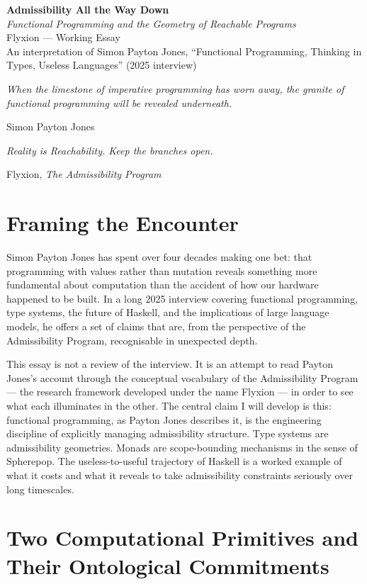 \documentclass[12pt]{article}
\begin{document}
\begin{center}
{\LARGE\bfseries Admissibility All the Way Down}\\[0.5em]
{\large\itshape Functional Programming and the Geometry of Reachable Programs}\\[1em]
{\normalsize Flyxion \quad — \quad Working Essay}\\[0.3em]
{\small An interpretation of Simon Payton Jones, ``Functional Programming,
Thinking in Types, Useless Languages'' (2025 interview)}
\end{center}

\bigskip

\epigraph{\itshape When the limestone of imperative programming has worn away,
the granite of functional programming will be revealed underneath.}{Simon
Payton Jones}

\epigraph{\itshape Reality is Reachability. Keep the branches open.}{Flyxion,
\emph{The Admissibility Program}}

\section{Framing the Encounter}

Simon Payton Jones has spent over four decades making one bet: that programming
with values rather than mutation reveals something more fundamental about
computation than the accident of how our hardware happened to be built. In a
long 2025 interview covering functional programming, type systems, the future
of Haskell, and the implications of large language models, he offers a set of
claims that are, from the perspective of the Admissibility Program, recognisable
in unexpected depth.

This essay is not a review of the interview. It is an attempt to read Payton
Jones's account through the conceptual vocabulary of the Admissibility Program
— the research framework developed under the name Flyxion — in order to see
what each illuminates in the other. The central claim I will develop is this:
functional programming, as Payton Jones describes it, is the engineering
discipline of explicitly managing admissibility structure. Type systems are
admissibility geometries. Monads are scope-bounding mechanisms in the sense of
Spherepop. The useless-to-useful trajectory of Haskell is a worked example of
what it costs and what it reveals to take admissibility constraints seriously
over long timescales.

\section{Two Computational Primitives and Their Ontological Commitments}
\end{document}
